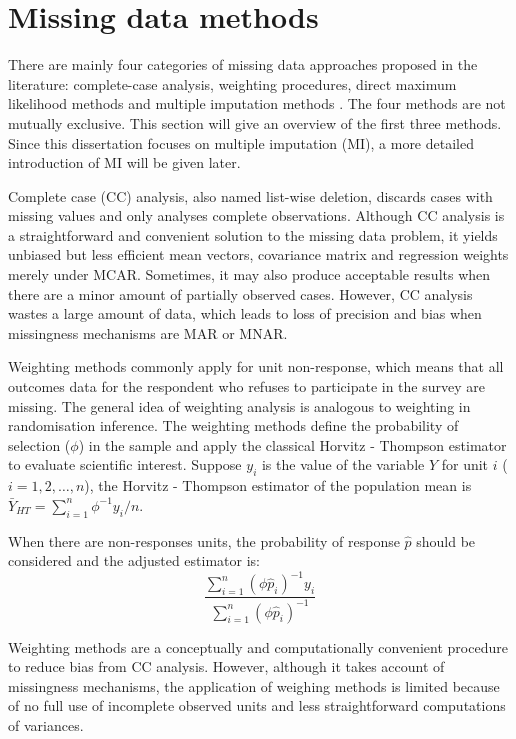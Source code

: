 \section{Missing data methods}
There are mainly four categories of missing data approaches proposed in the literature: complete-case analysis, weighting procedures, direct maximum likelihood methods and multiple imputation methods \citep{little2019statistical}. The four methods are not mutually exclusive. This section will give an overview of the first three methods. Since this dissertation focuses on multiple imputation (MI), a more detailed introduction of MI will be given later. 

Complete case (CC) analysis, also named list-wise deletion, discards cases with missing values and only analyses complete observations. Although CC analysis is a straightforward and convenient solution to the missing data problem, it yields unbiased but less efficient mean vectors, covariance matrix and regression weights merely under MCAR. Sometimes, it may also produce acceptable results when there are a minor amount of partially observed cases. However, CC analysis wastes a large amount of data, which leads to loss of precision and bias when missingness mechanisms are MAR or MNAR. 

Weighting methods commonly apply for unit non-response, which means that all outcomes data for the respondent who refuses to participate in the survey are missing. The general idea of weighting analysis is analogous to weighting in randomisation inference. The weighting methods define the probability of selection ($\phi$) in the sample and apply the classical Horvitz - Thompson estimator \citep{horvitz1952generalization} to evaluate scientific interest. Suppose $y_i$ is the value of the variable $Y$ for unit $i$ ($i = 1, 2, \dots, n$), the Horvitz - Thompson estimator of the population mean is $\bar{Y}_{HT} = \sum_{i=1}^{n}\phi^{-1}y_i/n$. 

When there are non-responses units, the probability of response $\hat{p}$ should be considered and the adjusted estimator is:
\begin{equation*}
	\frac{\sum_{i=1}^{n}(\phi\hat{p}_i)^{-1}y_i}{\sum_{i=1}^{n}(\phi\hat{p}_i)^{-1}}
\end{equation*}

Weighting methods are a conceptually and computationally convenient procedure to reduce bias from CC analysis. However, although it takes account of missingness mechanisms, the application of weighing methods is limited because of no full use of incomplete observed units and less straightforward computations of variances. 

